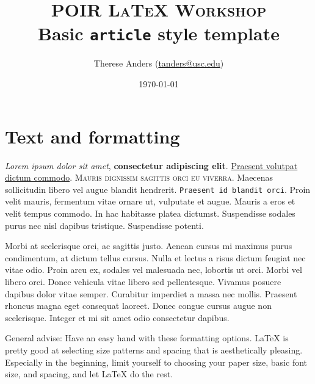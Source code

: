 \documentclass[11pt,letterpaper,oneside]{article} %
\begin{document}
\pagestyle{plain} %
\title{\small\textsc{POIR {\LaTeX} Workshop} \\
	\Large{Basic \texttt{article} style template}}
\author{Therese Anders (\href{mailto:tanders@usc.edu}{tanders@usc.edu})} 
\date{\today}
\maketitle %

\singlespacing

\tableofcontents %

\newpage %
\section{Text and formatting}
\doublespacing
\textit{Lorem ipsum dolor sit amet}, \textbf{consectetur adipiscing elit}. \underline{Praesent volutpat dictum commodo}. \textsc{Mauris dignissim sagittis orci eu viverra}. Maecenas sollicitudin libero vel augue blandit hendrerit. \texttt{Praesent id blandit orci}. Proin velit mauris, fermentum vitae ornare ut, vulputate et augue. Mauris a eros et velit tempus commodo. In hac habitasse platea dictumst. Suspendisse sodales purus nec nisl dapibus tristique. Suspendisse potenti.

\singlespacing
Morbi at scelerisque orci, ac sagittis justo. Aenean cursus mi maximus purus condimentum, at dictum tellus cursus. Nulla et lectus a risus dictum feugiat nec vitae odio. Proin arcu ex, sodales vel malesuada nec, lobortis ut orci. Morbi vel libero orci. Donec vehicula vitae libero sed pellentesque. Vivamus posuere dapibus dolor vitae semper. Curabitur imperdiet a massa nec mollis. Praesent rhoncus magna eget consequat laoreet. Donec congue cursus augue non scelerisque. {\tiny Integer et mi sit amet odio consectetur}                dapibus. %

\begin{Large} %
\begin{center}
General advise: Have an easy hand with these formatting options. {\LaTeX} is pretty good at selecting size patterns and spacing that is aesthetically pleasing. Especially in the beginning, limit yourself to choosing your paper size, basic font size, and spacing, and let {\LaTeX} do the rest.
\end{center}
\end{Large}
\end{document}
